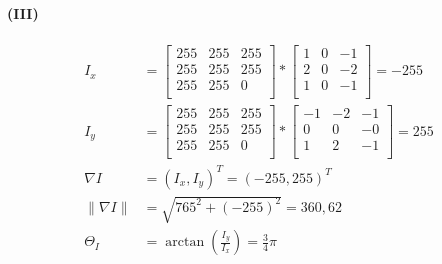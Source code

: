 \documentclass[a4paper]{article}
\begin{document}
\paragraph{(III)}
\begin{align*}
    I_x &= \begin{bmatrix}
        255 & 255 & 255\\
        255 & 255 & 255\\
        255 & 255 & 0\\
        \end{bmatrix}
         * 
         \begin{bmatrix}
        1 & 0 & -1\\
        2 & 0 & -2\\
        1 & 0 & -1\\
        \end{bmatrix}
        = -255\\
        I_y &= \begin{bmatrix}
        255 & 255 & 255\\
        255 & 255 & 255\\
        255 & 255 & 0\\
        \end{bmatrix}
         * 
         \begin{bmatrix}
        -1 & -2 & -1\\
        0 & 0 & -0\\
        1 & 2 & -1\\
        \end{bmatrix}
        = 255\\
        \nabla I &= (I_x,I_y)^T = (-255,255)^T\\
        \| \nabla I\| &= \sqrt{765^2+(-255)^2} = 360,62\\
        \Theta_I &= \operatorname{arctan}(\frac{I_y}{I_x}) = \frac{3}{4}\pi
\end{align*}
\end{document}
